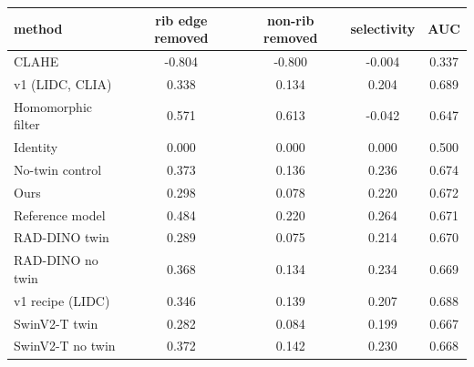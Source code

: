 \begin{tabular}{lcccc}
\toprule
method & rib edge removed & non-rib removed & selectivity & AUC \\
\midrule
CLAHE & -0.804 & -0.800 & -0.004 & 0.337 \\
v1 (LIDC, CLIA) & 0.338 & 0.134 & 0.204 & 0.689 \\
Homomorphic filter & 0.571 & 0.613 & -0.042 & 0.647 \\
Identity & 0.000 & 0.000 & 0.000 & 0.500 \\
No-twin control & 0.373 & 0.136 & 0.236 & 0.674 \\
Ours & 0.298 & 0.078 & 0.220 & 0.672 \\
Reference model & 0.484 & 0.220 & 0.264 & 0.671 \\
RAD-DINO twin & 0.289 & 0.075 & 0.214 & 0.670 \\
RAD-DINO no twin & 0.368 & 0.134 & 0.234 & 0.669 \\
v1 recipe (LIDC) & 0.346 & 0.139 & 0.207 & 0.688 \\
SwinV2-T twin & 0.282 & 0.084 & 0.199 & 0.667 \\
SwinV2-T no twin & 0.372 & 0.142 & 0.230 & 0.668 \\
\bottomrule
\end{tabular}
